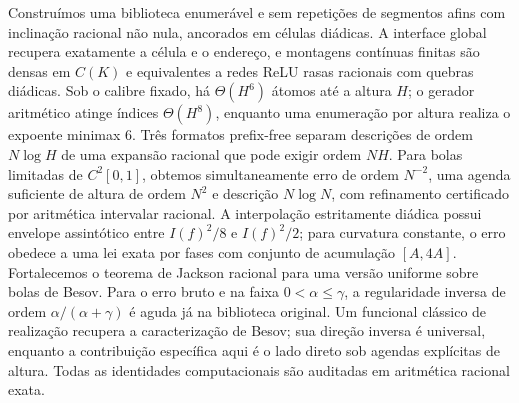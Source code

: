 Construímos uma biblioteca enumerável e sem repetições de segmentos afins com inclinação racional não nula, ancorados em células diádicas. A interface global recupera exatamente a célula e o endereço, e montagens contínuas finitas são densas em $C(K)$ e equivalentes a redes ReLU rasas racionais com quebras diádicas. Sob o calibre fixado, há $\Theta(H^6)$ átomos até a altura $H$; o gerador aritmético atinge índices $\Theta(H^8)$, enquanto uma enumeração por altura realiza o expoente minimax $6$. Três formatos prefix-free separam descrições de ordem $N\log H$ de uma expansão racional que pode exigir ordem $NH$. Para bolas limitadas de $C^2[0,1]$, obtemos simultaneamente erro de ordem $N^{-2}$, uma agenda suficiente de altura de ordem $N^2$ e descrição $N\log N$, com refinamento certificado por aritmética intervalar racional. A interpolação estritamente diádica possui envelope assintótico entre $I(f)^2/8$ e $I(f)^2/2$; para curvatura constante, o erro obedece a uma lei exata por fases com conjunto de acumulação $[A,4A]$. Fortalecemos o teorema de Jackson racional para uma versão uniforme sobre bolas de Besov. Para o erro bruto e na faixa $0<\alpha\le\gamma$, a regularidade inversa de ordem $\alpha/(\alpha+\gamma)$ é aguda já na biblioteca original. Um funcional clássico de realização recupera a caracterização de Besov; sua direção inversa é universal, enquanto a contribuição específica aqui é o lado direto sob agendas explícitas de altura. Todas as identidades computacionais são auditadas em aritmética racional exata.
